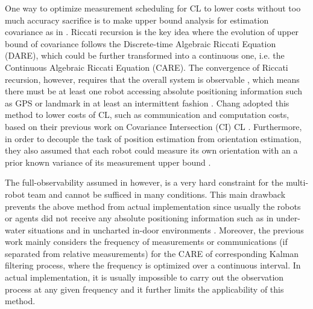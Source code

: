 \documentclass[conference]{IEEEtran}
\begin{document}
One way to optimize measurement scheduling for CL to lower costs without too much accuracy sacrifice is to make upper bound analysis for estimation covariance as in \cite{mourikis2006optimal,chang2018optimal}.
Riccati recursion is the key idea where the evolution of upper bound of covariance follows the Discrete-time Algebraic Riccati Equation (DARE), which could be further transformed into a continuous one, i.e. the Continuous Algebraic Riccati Equation (CARE).
The convergence of Riccati recursion, however, requires that the overall system is observable \cite{mourikis2006optimal,chang2018controltheoretical}, which means there must be at least one robot accessing absolute positioning information such as GPS or landmark  in at least an intermittent fashion \cite{mourikis2006optimal,roumeliotis2002distributed}.
Chang \cite{chang2018optimal,chang2018controltheoretical} adopted this method to lower costs of CL, such as communication and computation costs, based on their previous work on Covariance Intersection (CI) CL \cite{chang2017multirobot}.
Furthermore, in order to decouple the task of position estimation from orientation estimation, they also assumed that each robot could measure its own orientation with an a prior known variance of its measurement upper bound \cite{mourikis2006optimal,chang2018optimal}.

The full-observability assumed in \cite{mourikis2006optimal,chang2018optimal} however, is a very hard constraint for the multi-robot team and cannot be sufficed in many conditions.
This main drawback prevents the above method from actual implementation since usually the robots or agents did not receive any absolute positioning information such as in under-water situations \cite{bahr2009cooperative} and in uncharted in-door environments \cite{hausman2015cooperative,zhu2018loosely}.
Moreover, the previous work \cite{mourikis2006optimal,chang2018optimal} mainly considers the frequency of measurements or communications (if separated from relative measurements) for the CARE of corresponding Kalman filtering process, where the frequency is optimized over a continuous interval.
In actual implementation, it is usually impossible to carry out the observation process at any given frequency and it further limits the applicability of this method.
\end{document}
